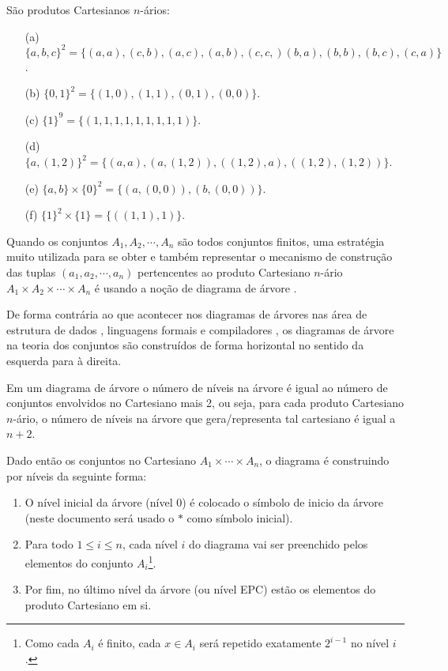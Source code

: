 \begin{exemplo}\label{exe:CartesianoNario3}
  São produtos Cartesianos $n$-ários:
	\begin{itemize}
		\item[(a)] $\{a, b, c\}^2 = \{(a, a), (c, b), (a, c), (a, b), (c, c, )(b, a), (b, b), (b, c), (c, a)\}$.
		\item[(b)] $\{0, 1\}^2 = \{(1, 0), (1, 1), (0, 1), (0, 0)\}$.
		\item[(c)] $\{1\}^9 = \{(1, 1, 1, 1, 1, 1, 1, 1, 1)\}$.
    \item[(d)] $\{a, (1, 2)\}^2 = \{(a, a),  (a, (1, 2)), ((1, 2), a), ((1, 2), (1, 2))\}$.
    \item[(e)] $\{a, b\} \times \{0\}^2 = \{(a, (0,0)), (b, (0,0))\}$.
    \item[(f)] $\{1\}^2 \times \{1\} = \{((1,1), 1)\}$.
	\end{itemize}
\end{exemplo}

Quando os conjuntos $A_1, A_2, \cdots, A_n$ são todos conjuntos finitos, uma estratégia muito utilizada para se obter e também representar o mecanismo de construção das tuplas $(a_1, a_2, \cdots, a_n)$ pertencentes ao produto Cartesiano $n$-ário $A_1 \times A_2 \times \cdots \times A_n$ é usando a noção de diagrama de árvore \cite{lipschutz1978-TC, lipschutz2013-MD}. 

\begin{nota}
  De forma contrária ao que acontecer nos diagramas de árvores nas área de estrutura de dados \cite{jaime1994}, linguagens formais \cite{benjaLivro2010, hopcroft2008, linz2006} e compiladores \cite{aho2007, cooper2017}, os diagramas de árvore na teoria dos conjuntos são construídos de forma horizontal no sentido da esquerda para à direita.
\end{nota}

Em um diagrama de árvore o número de níveis na árvore é igual ao número de conjuntos envolvidos no Cartesiano mais 2, ou seja, para cada produto Cartesiano $n$-ário, o número de níveis na árvore que gera/representa tal cartesiano é igual a $n+2$. 

Dado então os conjuntos no Cartesiano $A_1 \times \cdots \times A_n$, o diagrama é construindo por níveis da seguinte forma: 

\begin{enumerate}
  \item O nível inicial da árvore (nível 0) é colocado o símbolo de inicio da árvore (neste documento será usado o $\ast$ como símbolo inicial). 
  \item Para todo $1 \leq i \leq n$, cada nível $i$ do diagrama vai ser preenchido pelos elementos do conjunto $A_i$\footnote{Como cada $A_i$ é finito, cada $x \in A_i$ será repetido exatamente $2^{i-1}$ no nível $i$.}.
  \item Por fim, no último nível da árvore (ou nível EPC) estão os elementos do produto Cartesiano em si.
\end{enumerate}

